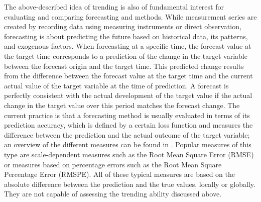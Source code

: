 The above-described idea of trending is also of fundamental interest for evaluating and comparing forecasting and methods. 
While measurement series are created by recording data using measuring instruments or direct observation, forecasting is about predicting the future based on historical data, its patterns, and exogenous factors. 
When forecasting at a specific time, the forecast value at the target time corresponds to a prediction of the change in the target variable between the forecast origin and the target time. 
This predicted change results from the difference between the forecast value at the target time and the current actual value of the target variable at the time of prediction. 
A forecast is perfectly consistent with the actual development of the target value if the actual change in the target value over this period matches the forecast change. 
The current practice is that a forecasting method is usually evaluated in terms of its prediction accuracy, which is defined by a certain loss function and measures the difference between the prediction and the actual outcome of the target variable; an overview of the different measures can be found in \cite{hyndman2006another}. 
Popular measures of this type are scale-dependent measures such as the Root Mean Square Error (RMSE) or measures based on percentage errors such as the Root Mean Square Percentage Error (RMSPE). 
All of these typical measures are based on the absolute difference between the prediction and the true values, locally or globally. They are not capable of assessing the trending ability discussed above.

